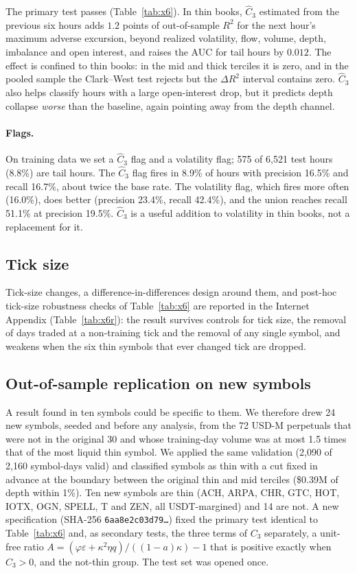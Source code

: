 \documentclass[12pt]{article}
\theoremstyle{definition}
\theoremstyle{remark}
\begin{document}
The primary test passes (Table~\ref{tab:x6}). In thin books, $\hat C_3$ estimated from the previous six hours adds $1.2$ points of out-of-sample $R^2$ for the next hour's maximum adverse excursion, beyond realized volatility, flow, volume, depth, imbalance and open interest, and raises the AUC for tail hours by $0.012$. The effect is confined to thin books: in the mid and thick terciles it is zero, and in the pooled sample the Clark--West test rejects but the $\Delta R^2$ interval contains zero. $\hat C_3$ also helps classify hours with a large open-interest drop, but it predicts depth collapse \emph{worse} than the baseline, again pointing away from the depth channel.

\paragraph{Flags.} On training data we set a $\hat C_3$ flag and a volatility flag; 575 of 6{,}521 test hours (8.8\%) are tail hours. The $\hat C_3$ flag fires in 8.9\% of hours with precision 16.5\% and recall 16.7\%, about twice the base rate. The volatility flag, which fires more often (16.0\%), does better (precision 23.4\%, recall 42.4\%), and the union reaches recall 51.1\% at precision 19.5\%. $\hat C_3$ is a useful addition to volatility in thin books, not a replacement for it.

\subsection{Tick size}\label{sec:tick}
Tick-size changes, a difference-in-differences design around them, and post-hoc tick-size robustness checks of Table~\ref{tab:x6} are reported in the Internet Appendix (Table~\ref{tab:x6r}): the result survives controls for tick size, the removal of days traded at a non-training tick and the removal of any single symbol, and weakens when the six thin symbols that ever changed tick are dropped.

\subsection{Out-of-sample replication on new symbols}\label{sec:y6}
A result found in ten symbols could be specific to them. We therefore drew 24 new symbols, seeded and before any analysis, from the 72 USD-M perpetuals that were not in the original 30 and whose training-day volume was at most 1.5 times that of the most liquid thin symbol. We applied the same validation (2{,}090 of 2{,}160 symbol-days valid) and classified symbols as thin with a cut fixed in advance at the boundary between the original thin and mid terciles (\$0.39M of depth within 1\%). Ten new symbols are thin (ACH, ARPA, CHR, GTC, HOT, IOTX, OGN, SPELL, T and ZEN, all USDT-margined) and 14 are not. A new specification (SHA-256 \texttt{6aa8e2c03d79\ldots}) fixed the primary test identical to Table~\ref{tab:x6} and, as secondary tests, the three terms of $C_3$ separately, a unit-free ratio $A=(\varphi\varepsilon+\kappa^2\eta q)/((1-a)\kappa)-1$ that is positive exactly when $C_3>0$, and the not-thin group. The test set was opened once.
\end{document}
